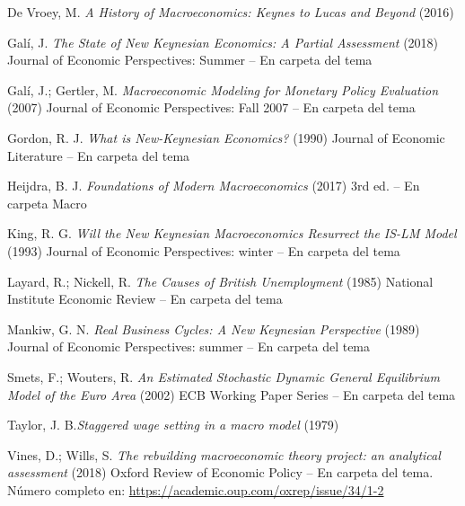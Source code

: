 \documentclass{nuevotema}
\begin{document}
De Vroey, M. \textit{A History of Macroeconomics: Keynes to Lucas and Beyond} (2016)

Galí, J. \textit{The State of New Keynesian Economics: A Partial Assessment} (2018) Journal of Economic Perspectives: Summer -- En carpeta del tema

Galí, J.; Gertler, M. \textit{Macroeconomic Modeling for Monetary Policy Evaluation} (2007) Journal of Economic Perspectives: Fall 2007 -- En carpeta del tema

Gordon, R. J. \textit{What is New-Keynesian Economics?} (1990) Journal of Economic Literature -- En carpeta del tema

Heijdra, B. J. \textit{Foundations of Modern 
Macroeconomics} (2017) 3rd ed. -- En carpeta Macro

King, R. G. \textit{Will the New Keynesian Macroeconomics Resurrect the IS-LM Model} (1993) Journal of Economic Perspectives: winter -- En carpeta del tema

Layard, R.; Nickell, R. \textit{The Causes of British Unemployment} (1985) National Institute Economic Review -- En carpeta del tema

Mankiw, G. N. \textit{Real Business Cycles: A New Keynesian Perspective} (1989) Journal of Economic Perspectives: summer -- En carpeta del tema

Smets, F.; Wouters, R. \textit{An Estimated Stochastic Dynamic General Equilibrium Model of the Euro Area} (2002) ECB Working Paper Series -- En carpeta del tema

Taylor, J. B.\textit{Staggered wage setting in a macro model} (1979) 

Vines, D.; Wills, S. \textit{The rebuilding macroeconomic theory project: an analytical assessment} (2018) Oxford Review of Economic Policy -- En carpeta del tema. Número completo en: \url{https://academic.oup.com/oxrep/issue/34/1-2}
\end{document}
